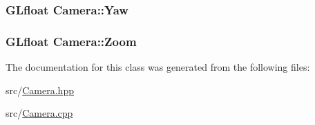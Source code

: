 \subsubsection[{\texorpdfstring{Yaw}{Yaw}}]{\setlength{\rightskip}{0pt plus 5cm}G\+Lfloat Camera\+::\+Yaw}\hypertarget{classCamera_abf27283ca0ccc51bae8446796ffc6b44}{}\label{classCamera_abf27283ca0ccc51bae8446796ffc6b44}
\subsubsection[{\texorpdfstring{Zoom}{Zoom}}]{\setlength{\rightskip}{0pt plus 5cm}G\+Lfloat Camera\+::\+Zoom}\hypertarget{classCamera_a1078d85d2e18bdc32291aabfcdda710a}{}\label{classCamera_a1078d85d2e18bdc32291aabfcdda710a}


The documentation for this class was generated from the following files\+:\begin{DoxyCompactItemize}
\item 
src/\hyperlink{Camera_8hpp}{Camera.\+hpp}\item 
src/\hyperlink{Camera_8cpp}{Camera.\+cpp}\end{DoxyCompactItemize}
